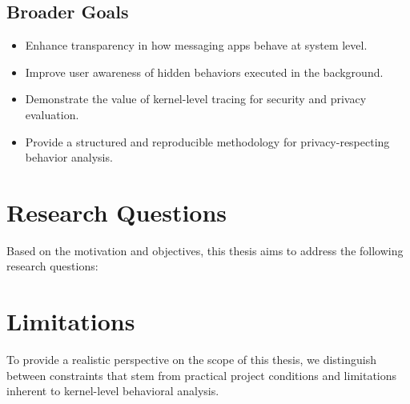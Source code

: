 \documentclass[a4paper,12pt]{report}
\begin{document}
\subsection*{Broader Goals}
\begin{itemize}
\item Enhance transparency in how messaging apps behave at system level.
\item Improve user awareness of hidden behaviors executed in the background.
\item Demonstrate the value of kernel-level tracing for security and privacy evaluation.
\item Provide a structured and reproducible methodology for privacy-respecting
behavior analysis.
\end{itemize}

\section{Research Questions}
Based on the motivation and objectives, this thesis aims to address the following
research questions:

\vspace{0.5em}
\noindent{}

\vspace{0.5em}
\noindent{}

\vspace{0.5em}
\noindent{}

\vspace{0.5em}
\noindent{}

\section{Limitations}

To provide a realistic perspective on the scope of this thesis, we distinguish between constraints that stem from practical project conditions and limitations inherent to kernel-level behavioral analysis.
\end{document}
